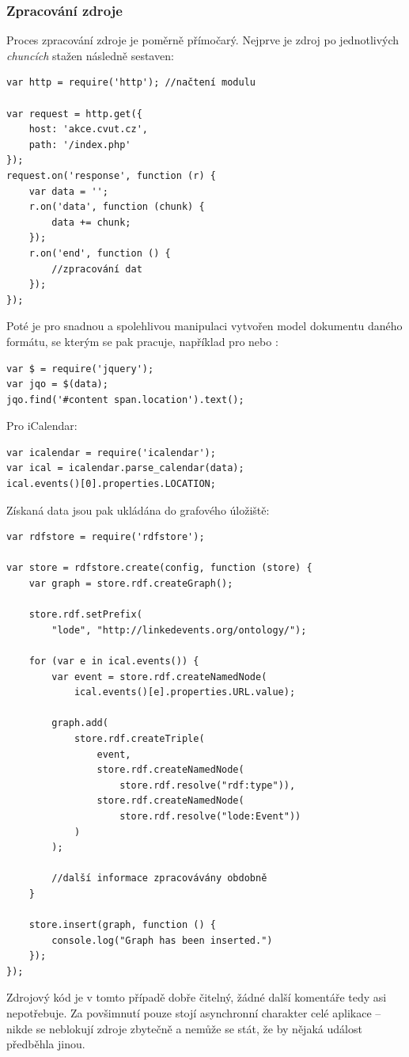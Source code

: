 \subsubsection{Zpracování zdroje}
Proces zpracování zdroje je poměrně přímočarý. Nejprve je zdroj po jednotlivých \textit{chuncích} stažen následně sestaven:
\begin{verbatim}
var http = require('http'); //načtení modulu

var request = http.get({
    host: 'akce.cvut.cz',
    path: '/index.php'
});
request.on('response', function (r) {
    var data = '';
    r.on('data', function (chunk) {
        data += chunk;
    });
    r.on('end', function () {
        //zpracování dat
    });
});
\end{verbatim}
Poté je pro snadnou a spolehlivou manipulaci vytvořen model dokumentu daného formátu, se kterým se pak pracuje, například pro  nebo :
\begin{verbatim}
var $ = require('jquery');
var jqo = $(data);
jqo.find('#content span.location').text();
\end{verbatim}
Pro iCalendar:
\begin{verbatim}
var icalendar = require('icalendar');
var ical = icalendar.parse_calendar(data);
ical.events()[0].properties.LOCATION;
\end{verbatim}
Získaná data jsou pak ukládána do grafového úložiště:
\begin{verbatim}
var rdfstore = require('rdfstore');

var store = rdfstore.create(config, function (store) {
    var graph = store.rdf.createGraph();

    store.rdf.setPrefix(
        "lode", "http://linkedevents.org/ontology/");

    for (var e in ical.events()) {
        var event = store.rdf.createNamedNode(
            ical.events()[e].properties.URL.value);

        graph.add(
            store.rdf.createTriple(
                event,
                store.rdf.createNamedNode(
                    store.rdf.resolve("rdf:type")),
                store.rdf.createNamedNode(
                    store.rdf.resolve("lode:Event"))
            )
        );

        //další informace zpracovávány obdobně
    }

    store.insert(graph, function () {
        console.log("Graph has been inserted.")
    });
});
\end{verbatim}
Zdrojový kód je v tomto případě dobře čitelný, žádné další komentáře tedy asi nepotřebuje. Za povšimnutí pouze stojí asynchronní charakter celé aplikace -- nikde se neblokují zdroje zbytečně a nemůže se stát, že by nějaká událost předběhla jinou.

